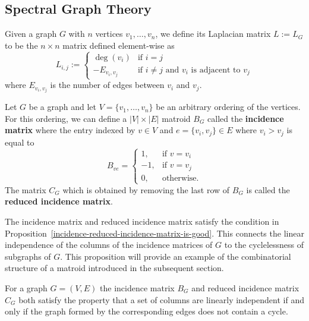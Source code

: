\documentclass{puthesis-UG}
\begin{document}
\subsection{Spectral Graph Theory}

\begin{defn}
	Given a graph $G$ with $n$ vertices $v_1, \ldots, v_n$, we define its Laplacian matrix $L := L_G$ to be the $n \times n$ matrix defined element-wise as 
	\[
		L_{i, j} := \begin{cases}
			\deg (v_i) & \text{if $i = j$} \\
			-E_{v_i, v_j} & \text{if $i \neq j$ and $v_i$ is adjacent to $v_j$}
		\end{cases}
	\]
	where $E_{v_i, v_j}$ is the number of edges between $v_i$ and $v_j$. 
\end{defn}

\begin{defn}
	Let $G$ be a graph and let $V = \{v_1, \ldots, v_n\}$ be an arbitrary ordering of the vertices. For this ordering, we can define a $|V| \times |E|$ matroid $B_G$ called the \textbf{incidence matrix} where the entry indexed by $v \in V$ and $e = \{v_i, v_j\} \in E$ where $v_i > v_j$ is equal to 
	\[
		B_{ve} = \begin{cases}
			1, & \text{if $v = v_i$} \\
			-1, & \text{if $v = v_j$} \\
			0, & \text{otherwise.}
		\end{cases}
	\]
	The matrix $C_G$ which is obtained by removing the last row of $B_G$ is called the \textbf{reduced incidence matrix}. 
\end{defn}

The incidence matrix and reduced incidence matrix satisfy the condition in Proposition~\ref{incidence-reduced-incidence-matrix-is-good}. This connects the linear independence of the columns of the incidence matrices of $G$ to the cyclelessness of subgraphs of $G$. This proposition will provide an example of the combinatorial structure of a matroid introduced in the subsequent section. 

\begin{prop} \label{incidence-reduced-incidence-matrix-is-good}
	For a graph $G = (V, E)$ the incidence matrix $B_G$ and reduced incidence matrix $C_G$ both satisfy the property that a set of columns are linearly independent if and only if the graph formed by the corresponding edges does not contain a cycle. 
\end{prop}
\end{document}
